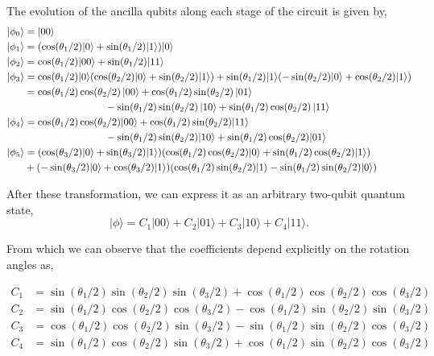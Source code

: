 The evolution of the ancilla qubits along each stage of the circuit is given by,
\begin{align*}
|\phi_0\rangle &= |00 \rangle \\
|\phi_1\rangle &= (\cos(\theta_1/2)|0\rangle + \sin(\theta_1/2)|1\rangle)|0\rangle\\
|\phi_2\rangle & = \cos(\theta_1/2)|00\rangle + \sin(\theta_1/2)|11\rangle\\
|\phi_3\rangle &=\cos(\theta_1/2)|0\rangle(\cos(\theta_2/2)|0\rangle + \sin(\theta_2/2)|1\rangle) + \sin(\theta_1/2)|1\rangle(-\sin(\theta_2/2)|0\rangle + \cos(\theta_2/2)|1\rangle)\\
&=\cos(\theta_1/2)\cos(\theta_2/2)\ket{00}+\cos(\theta_1/2)\sin(\theta_2/2)\ket{01}\\&\qquad\qquad\qquad\qquad-\sin(\theta_1/2)\sin(\theta_2/2)\ket{10}+\sin(\theta_1/2)\cos(\theta_2/2)\ket{11}\\
|\phi_4\rangle &=\cos(\theta_1/2)\cos(\theta_2/2)|00\rangle + \cos(\theta_1/2)\sin(\theta_2/2)|11\rangle\\&\qquad\qquad\qquad\qquad- \sin(\theta_1/2)\sin(\theta_2/2)|10\rangle + \sin(\theta_1/2)\cos(\theta_2/2)|01\rangle\\
|\phi_5\rangle&=(\cos(\theta_3/2)|0\rangle + \sin(\theta_3/2)|1\rangle) 
(\cos(\theta_1/2)\cos(\theta_2/2)|0\rangle+\sin(\theta_1/2)\cos(\theta_2/2)|1\rangle)\\
&+(-\sin(\theta_3/2)|0\rangle + \cos(\theta_3/2)|1\rangle)
(\cos(\theta_1/2)\sin(\theta_2/2)|1\rangle- \sin(\theta_1/2)\sin(\theta_2/2)|0\rangle)
\end{align*}

After these transformation, we can express it as an arbitrary two-qubit quantum state,
\begin{equation}
|\phi\rangle= C_1|00\rangle + C_2|01\rangle + C_3|10\rangle +C_4 |11\rangle.
\end{equation}

From which we can observe that the coefficients depend explicitly on the rotation angles as,

\begin{align}
    C_1 &=     \sin(\theta_1/2)  \sin(\theta_2/2)  \sin(\theta_3/2) +  \cos(\theta_1/2) \cos(\theta_2/2)  \cos(\theta_3/2)\\
    C_2 &=   \sin(\theta_1/2)  \cos(\theta_2/2) \cos(\theta_3/2) -   \cos(\theta_1/2) \sin(\theta_2/2)  \sin(\theta_3/2)   \\
    C_3 &=   \cos(\theta_1/2)  \cos(\theta_2/2) \sin(\theta_3/2) -  \sin(\theta_1/2)  \sin(\theta_2/2)  \cos(\theta_3/2)\\
    C_4 &=   \sin(\theta_1/2)  \cos(\theta_2/2) \sin(\theta_3/2)  +    \cos(\theta_1/2) \sin(\theta_2/2) \cos(\theta_3/2)
\end{align}

